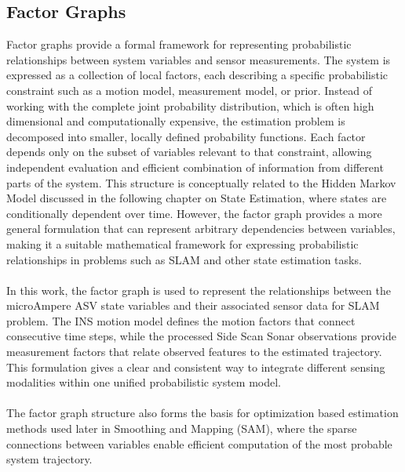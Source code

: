 \subsection{Factor Graphs}
Factor graphs provide a formal framework for representing probabilistic relationships between system variables and sensor measurements. The system is expressed as a collection of local factors, each describing a specific probabilistic constraint such as a motion model, measurement model, or prior. Instead of working with the complete joint probability distribution, which is often high dimensional and computationally expensive, the estimation problem is decomposed into smaller, locally defined probability functions. Each factor depends only on the subset of variables relevant to that constraint, allowing independent evaluation and efficient combination of information from different parts of the system. This structure is conceptually related to the Hidden Markov Model discussed in the following chapter on State Estimation, where states are conditionally dependent over time. However, the factor graph provides a more general formulation that can represent arbitrary dependencies between variables, making it a suitable mathematical framework for expressing probabilistic relationships in problems such as SLAM and other state estimation tasks.
\\ \\
In this work, the factor graph is used to represent the relationships between the microAmpere ASV state variables and their associated sensor data for SLAM problem. The INS motion model defines the motion factors that connect consecutive time steps, while the processed Side Scan Sonar observations provide measurement factors that relate observed features to the estimated trajectory. This formulation gives a clear and consistent way to integrate different sensing modalities within one unified probabilistic system model.  
\\ \\
The factor graph structure also forms the basis for optimization based estimation methods used later in Smoothing and Mapping (SAM), where the sparse connections between variables enable efficient computation of the most probable system trajectory.
